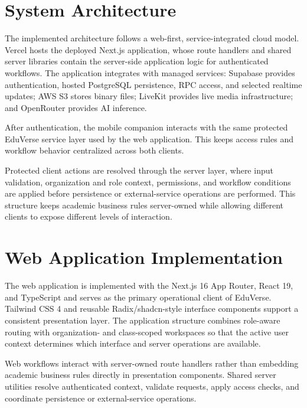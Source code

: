 \FloatBarrier

\section{System Architecture}\label{sec:implementation_system_architecture}

The implemented architecture follows a web-first, service-integrated cloud
model. Vercel hosts the deployed Next.js application, whose route handlers and
shared server libraries contain the server-side application logic for
authenticated workflows. The application integrates with managed services:
Supabase provides authentication, hosted PostgreSQL persistence, RPC access,
and selected realtime updates; AWS S3 stores binary files; LiveKit provides
live media infrastructure; and OpenRouter provides AI inference.

After authentication, the mobile companion interacts with the same protected
EduVerse service layer used by the web application. This keeps access rules and
workflow behavior centralized across both clients.

Protected client actions are resolved through the server layer, where input
validation, organization and role context, permissions, and workflow conditions
are applied before persistence or external-service operations are performed.
This structure keeps academic business rules server-owned while allowing
different clients to expose different levels of interaction.

\section{Web Application Implementation}
\label{sec:web_application_implementation}

The web application is implemented with the Next.js 16 App Router, React 19,
and TypeScript and serves as the primary operational client of EduVerse.
Tailwind CSS 4 and reusable Radix/shadcn-style interface components support a
consistent presentation layer. The application structure combines role-aware
routing with organization- and class-scoped workspaces so that the active user
context determines which interface and server operations are available.

Web workflows interact with server-owned route handlers rather than embedding
academic business rules directly in presentation components. Shared server
utilities resolve authenticated context, validate requests, apply access checks,
and coordinate persistence or external-service operations.

